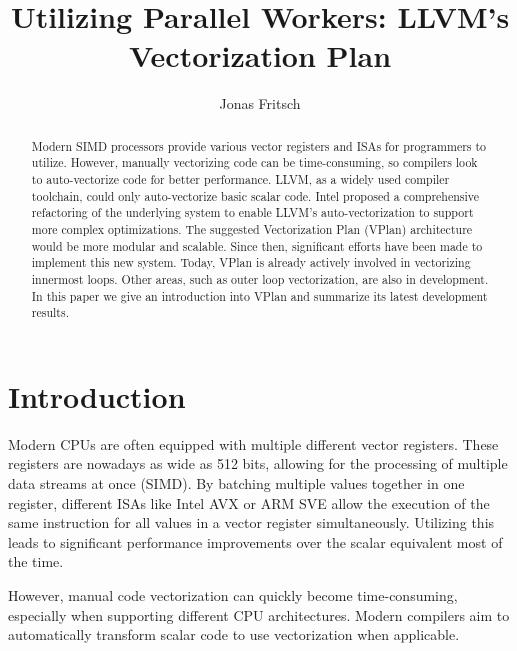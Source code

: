 \documentclass[sigplan,11pt,nonacm]{acmart}
\begin{document}
\title[State of LLVM's Vectorization Plan]{Utilizing Parallel Workers: LLVM's Vectorization Plan}
\author{Jonas Fritsch}

\begin{abstract}
  Modern SIMD processors provide various vector registers and ISAs for programmers to utilize. 
  However, manually vectorizing code can be time-consuming, so compilers look to auto-vectorize 
  code for better performance. LLVM, as a widely used compiler toolchain, could only auto-vectorize 
  basic scalar code. Intel proposed a comprehensive refactoring of the underlying system to enable 
  LLVM's auto-vectorization to support more complex optimizations. The suggested Vectorization Plan 
  (VPlan) architecture would be more modular and scalable. Since then, significant efforts have been 
  made to implement this new system. Today, VPlan is already actively involved in vectorizing 
  innermost loops. Other areas, such as outer loop vectorization, are also in development.
  In this paper we give an introduction into VPlan and summarize its latest development results.
\end{abstract}

\maketitle



\section{Introduction}
\label{sec:introduction}
Modern CPUs are often equipped with multiple different vector registers. These registers are nowadays 
as wide as 512 bits, allowing for the processing of multiple data streams at once (SIMD). By 
batching multiple values together in one register, different ISAs like Intel AVX or ARM SVE allow 
the execution of the same instruction for all values in a vector register simultaneously. 
Utilizing this leads to significant performance improvements over the scalar equivalent most of 
the time.

However, manual code vectorization can quickly become time-consuming, especially when
supporting different CPU architectures. Modern compilers aim to automatically transform scalar code
to use vectorization when applicable.
\end{document}
